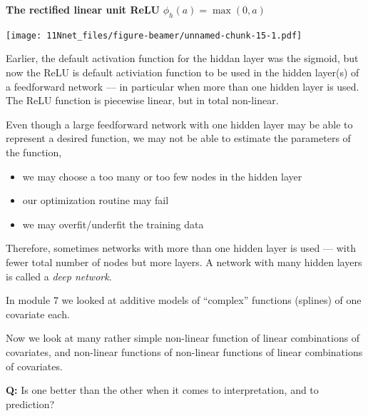 \documentclass[10pt,ignorenonframetext,]{beamer}
\providecommand{\tightlist}{%
  \setlength{\itemsep}{0pt}\setlength{\parskip}{0pt}}
\begin{document}
\begin{frame}

\textbf{The rectified linear unit ReLU} \(\phi_h(a)=\max(0,a)\)

\texttt{[image: 11Nnet\_files/figure-beamer/unnamed-chunk-15-1.pdf]}

\end{frame}

\begin{frame}

Earlier, the default activation function for the hiddan layer was the
sigmoid, but now the ReLU is default activiation function to be used in
the hidden layer(s) of a feedforward network --- in particular when more
than one hidden layer is used. The ReLU function is piecewise linear,
but in total non-linear.

\end{frame}

\begin{frame}

Even though a large feedforward network with one hidden layer may be
able to represent a desired function, we may not be able to estimate the
parameters of the function,

\begin{itemize}
\tightlist
\item
  we may choose a too many or too few nodes in the hidden layer
\item
  our optimization routine may fail
\item
  we may overfit/underfit the training data
\end{itemize}

Therefore, sometimes networks with more than one hidden layer is used
--- with fewer total number of nodes but more layers. A network with
many hidden layers is called a \emph{deep network}.

\end{frame}

\begin{frame}

In module 7 we looked at additive models of ``complex'' functions
(splines) of one covariate each.

Now we look at many rather simple non-linear function of linear
combinations of covariates, and non-linear functions of non-linear
functions of linear combinations of covariates.

\textbf{Q:} Is one better than the other when it comes to
interpretation, and to prediction?

\end{frame}
\end{document}
